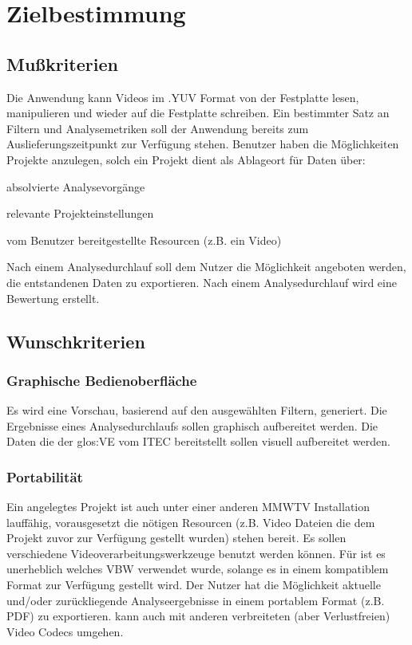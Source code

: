\chapter{Zielbestimmung}

\section{Mußkriterien}
\setcounter{counterKriterien}{0}
 Die Anwendung kann Videos im .YUV Format von der Festplatte lesen, manipulieren und wieder auf die Festplatte schreiben.
 Ein bestimmter Satz an Filtern und Analysemetriken soll der Anwendung bereits zum Auslieferungszeitpunkt zur Verfügung stehen.
 Benutzer haben die Möglichkeiten Projekte anzulegen, solch ein Projekt dient als Ablageort für Daten über:
\begin{compactitem}
\item absolvierte Analysevorgänge
\item relevante Projekteinstellungen
\item vom Benutzer bereitgestellte Resourcen (z.B. ein Video)
\end{compactitem}
 Nach einem Analysedurchlauf soll dem Nutzer die Möglichkeit angeboten werden, die entstandenen Daten zu exportieren.
 Nach einem Analysedurchlauf wird eine Bewertung erstellt.

\section{Wunschkriterien}
\setcounter{counterKriterien}{0}
\subsection{Graphische Bedienoberfläche}
 Es wird eine Vorschau, basierend auf den ausgewählten Filtern, generiert.
 Die Ergebnisse eines Analysedurchlaufs sollen graphisch aufbereitet werden.
 Die Daten die der \gls{glos:VE} vom \gls{ITEC}  bereitstellt sollen visuell aufbereitet werden.
\subsection{Portabilität}
 Ein angelegtes Projekt ist auch unter einer anderen MMWTV Installation lauffähig, vorausgesetzt die nötigen Resourcen (z.B. Video Dateien die dem Projekt zuvor zur Verfügung gestellt wurden) stehen bereit.
 Es sollen verschiedene Videoverarbeitungswerkzeuge benutzt werden können.
 Für \projektTitel ist es unerheblich welches \gls{VBW} verwendet wurde, solange es in einem
			kompatiblem Format zur Verfügung gestellt wird.
 Der Nutzer hat die Möglichkeit aktuelle und/oder zurückliegende Analyseergebnisse in einem
			portablem Format (z.B. PDF) zu exportieren.
 \projektTitel kann auch mit anderen verbreiteten (aber Verlustfreien) Video Codecs umgehen.
